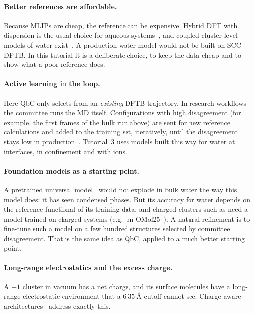 \documentclass[11pt,a4paper]{article}
\begin{document}
\paragraph{Better references are affordable.} Because MLIPs are cheap, the
reference can be expensive. Hybrid DFT with dispersion is the usual choice
for aqueous systems~\cite{Schran2021}, and coupled-cluster-level models of
water exist~\cite{Daru2022}. A production water model would not be built on
SCC-DFTB. In this tutorial it is a deliberate choice, to keep the data
cheap and to show what a poor reference does.

\paragraph{Active learning in the loop.} Here QbC only selects from an
\emph{existing} DFTB trajectory. In research workflows the committee runs the
MD itself. Configurations with high disagreement (for example, the first
frames of the bulk run above) are sent for new reference calculations and
added to the training set, iteratively, until the disagreement stays low in
production~\cite{Schran2020,Schran2021}. Tutorial~3 uses models built this
way for water at interfaces, in confinement and with ions.

\paragraph{Foundation models as a starting point.} A pretrained universal
model~\cite{Batatia2023,Wood2025} would not explode in bulk water the way this
model does: it has seen condensed phases. But its accuracy for water depends
on the reference functional of its training data, and charged clusters such
as  need a model trained on charged systems (e.g.\ on
OMol25~\cite{Levine2025}). A natural refinement is to fine-tune such a model on a
few hundred structures selected by committee disagreement. That is the same
idea as QbC, applied to a much better starting point.

\paragraph{Long-range electrostatics and the excess charge.} A $+1$ cluster
in vacuum has a net charge, and its surface molecules have a long-range
electrostatic environment that a $\SI{6.35}{\angstrom}$ cutoff cannot see.
Charge-aware architectures~\cite{Ko2021,Cheng2024} address exactly this.
\end{document}
